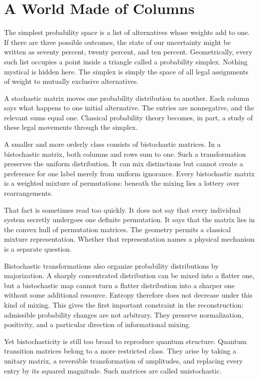 \documentclass[12pt,openany]{book}
\begin{document}
\chapter{A World Made of Columns}
The simplest probability space is a list of alternatives whose weights add to one. If there are three possible outcomes, the state of our uncertainty might be written as seventy percent, twenty percent, and ten percent. Geometrically, every such list occupies a point inside a triangle called a probability simplex. Nothing mystical is hidden here. The simplex is simply the space of all legal assignments of weight to mutually exclusive alternatives.

A stochastic matrix moves one probability distribution to another. Each column says what happens to one initial alternative. The entries are nonnegative, and the relevant sums equal one. Classical probability theory becomes, in part, a study of these legal movements through the simplex.

A smaller and more orderly class consists of bistochastic matrices. In a bistochastic matrix, both columns and rows sum to one. Such a transformation preserves the uniform distribution. It can mix distinctions but cannot create a preference for one label merely from uniform ignorance. Every bistochastic matrix is a weighted mixture of permutations: beneath the mixing lies a lottery over rearrangements.

That fact is sometimes read too quickly. It does not say that every individual system secretly undergoes one definite permutation. It says that the matrix lies in the convex hull of permutation matrices. The geometry permits a classical mixture representation. Whether that representation names a physical mechanism is a separate question.

Bistochastic transformations also organize probability distributions by majorization. A sharply concentrated distribution can be mixed into a flatter one, but a bistochastic map cannot turn a flatter distribution into a sharper one without some additional resource. Entropy therefore does not decrease under this kind of mixing. This gives the first important constraint in the reconstruction: admissible probability changes are not arbitrary. They preserve normalization, positivity, and a particular direction of informational mixing.

Yet bistochasticity is still too broad to reproduce quantum structure. Quantum transition matrices belong to a more restricted class. They arise by taking a unitary matrix, a reversible transformation of amplitudes, and replacing every entry by its squared magnitude. Such matrices are called unistochastic.
\end{document}
